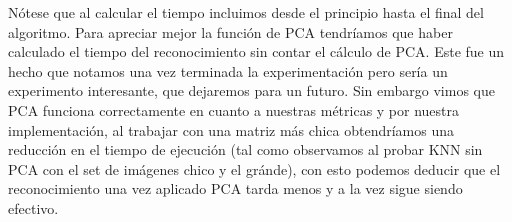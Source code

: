 Nótese que al calcular el tiempo incluimos desde el principio hasta el final del algoritmo. Para apreciar mejor la función de PCA tendríamos que haber calculado el tiempo del reconocimiento sin contar el cálculo de PCA. Este fue un hecho que notamos una vez terminada la experimentación pero sería un experimento interesante, que dejaremos para un futuro.\newline
Sin embargo vimos que PCA funciona correctamente en cuanto a nuestras métricas y por nuestra implementación, al trabajar con una matriz más chica obtendríamos una reducción en el tiempo de ejecución (tal como observamos al probar KNN sin PCA con el set de imágenes chico y el gránde), con esto podemos deducir que el reconocimiento una vez aplicado PCA tarda menos y a la vez sigue siendo efectivo.


